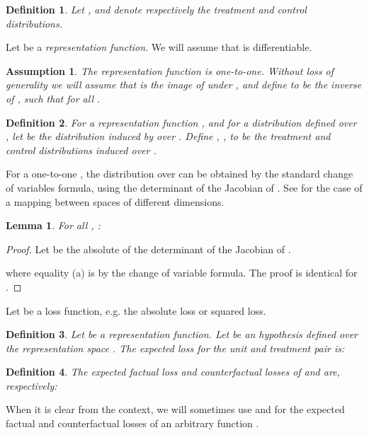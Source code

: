 \documentclass{article}
\newtheorem{thmappdef}{Definition}
\newtheorem{thmappasmp}{Assumption}
\newtheorem{thmapplem}{Lemma}
\begin{document}
\begin{thmappdef}
Let , and  denote respectively the treatment and control distributions.
\end{thmappdef}



Let  be a \emph{representation function}. We will assume that  is differentiable.

\begin{thmappasmp}\label{asmp:invA}
The representation function  is one-to-one. Without loss of generality we will assume that  is the image of  under , and define  to be the inverse of , such that  for all .
\end{thmappasmp}

\begin{thmappdef}\label{def:pphiA}
For a representation function , and for a distribution  defined over , let  be the distribution induced by  over . Define , , to be the treatment and control distributions induced over .
\end{thmappdef}


For a one-to-one , the distribution  over  can be obtained by the standard change of variables formula, using the determinant of the Jacobian of . See \cite{ben1999change} for the case of a mapping  between spaces of different dimensions.



\begin{thmapplem}\label{lemma:smpl_alg3}
For all , :

\end{thmapplem}
\begin{proof}
Let  be the absolute of the determinant of the Jacobian of .

where equality (a) is by the change of variable formula. The proof is identical for .
\end{proof}






Let  be a loss function, e.g. the absolute loss or squared loss.
\begin{thmappdef}\label{def:perunitlossA}
Let  be a representation function.
Let  be an hypothesis defined over the representation space .
The expected loss for the unit and treatment pair  is:

\end{thmappdef}

\begin{thmappdef}\label{def:epfepcf}
The expected factual loss and counterfactual losses of  and  are, respectively:


\end{thmappdef}
When it is clear from the context, we will sometimes use  and  for the expected factual and counterfactual losses of an arbitrary function .
\end{document}
